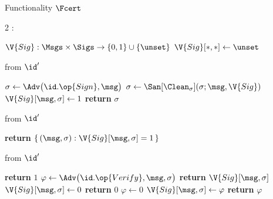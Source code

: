 \begin{interface}[nofloat]{Functionality $\Fcert$ \\
}

{\scriptsize
\setlength{\columnsep}{1.4em}
\begin{multicols}{2}
:
\begin{algorithmic}[1]
\setcounter{contline}{0}\algcont
\State $\V{Sig} : \Msgs \times \Sigs \to \{0,1\} \cup \{\unset\}$
\State $\V{Sig}[*,*] \gets \unset$
\algsave
\end{algorithmic}
\vspace{1.4ex}

 \quad from $\id'$
\begin{algorithmic}[1]
\algcont
{} \label{ln:certbind}
\State $\sigma \gets \Adv\bigl(\id.\op{Sign}, \msg\bigr)$
\State $\sigma \gets \San[\Clean_{\sigma}](\sigma; \msg, \V{Sig})$ \label{ln:certsan}
\State $\V{Sig}[\msg, \sigma] \gets 1$ \label{ln:certrec}
\State \textbf{return} $\sigma$
\algsave
\end{algorithmic}
\vspace{1.4ex}

 \quad from $\id'$
\begin{algorithmic}[1]
\algcont
\State \textbf{return} $\{\, (\msg,\sigma) : \V{Sig}[\msg,\sigma] = 1 \,\}$ \label{ln:certleak}
\algsave
\end{algorithmic}
\vspace{1.4ex}

\columnbreak

 \quad from $\id'$
\begin{algorithmic}[1]
\algcont
{}
  \State \textbf{return} $1$ \label{ln:certcomplete}
\EndIf
\State $\varphi \gets \Adv\bigl(\id.\op{Verify}, \msg, \sigma\bigr)$
  \State \textbf{return} $\V{Sig}[\msg, \sigma]$
\EndIf
{}
  \State $\V{Sig}[\msg, \sigma] \gets 0$ \label{ln:certunforge}
  \State \textbf{return} $0$
\EndIf
{}
  \State $\varphi \gets 0$
\EndIf
\State $\V{Sig}[\msg, \sigma] \gets \varphi$ \label{ln:certconsist}
\State \textbf{return} $\varphi$
\algsave
\end{algorithmic}
\vspace{1.4ex}


\end{multicols}}
\end{interface}
